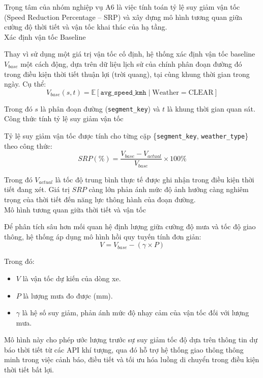 
Trọng tâm của nhóm nghiệp vụ A6 là việc tính toán tỷ lệ suy giảm vận tốc (Speed Reduction Percentage -- SRP) và xây dựng mô hình tương quan giữa cường độ thời tiết và vận tốc khai thác của hạ tầng.\\

Xác định vận tốc Baseline

Thay vì sử dụng một giá trị vận tốc cố định, hệ thống xác định vận tốc baseline $V_{base}$ một cách động, dựa trên dữ liệu lịch sử của chính phân đoạn đường đó trong điều kiện thời tiết thuận lợi (trời quang), tại cùng khung thời gian trong ngày. Cụ thể:
\[
V_{base}(s, t) =
\mathbb{E}[\texttt{avg\_speed\_kmh}
\mid \text{Weather} = \text{CLEAR}]
\]

Trong đó $s$ là phân đoạn đường (\texttt{segment\_key}) và $t$ là khung thời gian quan sát.\\

Công thức tính tỷ lệ suy giảm vận tốc

Tỷ lệ suy giảm vận tốc được tính cho từng cặp \{\texttt{segment\_key}, \texttt{weather\_type}\} theo công thức:
\[
SRP(\%) = \frac{V_{base} - V_{actual}}{V_{base}} \times 100\%
\]

Trong đó $V_{actual}$ là tốc độ trung bình thực tế được ghi nhận trong điều kiện thời tiết đang xét. Giá trị $SRP$ càng lớn phản ánh mức độ ảnh hưởng càng nghiêm trọng của thời tiết đến năng lực thông hành của đoạn đường.\\

Mô hình tương quan giữa thời tiết và vận tốc

Để phân tích sâu hơn mối quan hệ định lượng giữa cường độ mưa và tốc độ giao thông, hệ thống áp dụng mô hình hồi quy tuyến tính đơn giản:
\[
V = V_{base} - (\gamma \times P)
\]

Trong đó:
\begin{itemize}
    \item $V$ là vận tốc dự kiến của dòng xe.
    \item $P$ là lượng mưa đo được (mm).
    \item $\gamma$ là hệ số suy giảm, phản ánh mức độ nhạy cảm của vận tốc đối với lượng mưa.
\end{itemize}

Mô hình này cho phép ước lượng trước sự suy giảm tốc độ dựa trên thông tin dự báo thời tiết từ các API khí tượng, qua đó hỗ trợ hệ thống giao thông thông minh trong việc cảnh báo, điều tiết và tối ưu hóa luồng di chuyển trong điều kiện thời tiết bất lợi.

